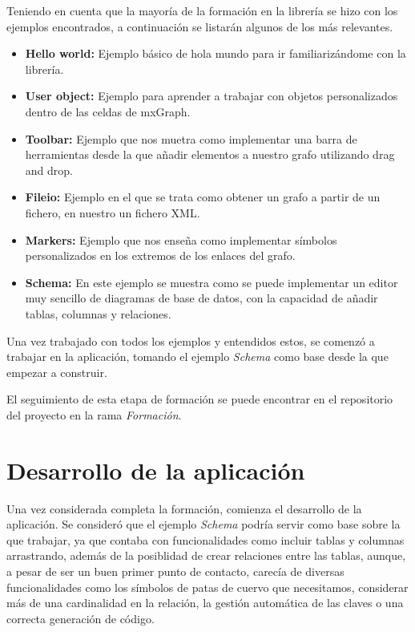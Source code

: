 Teniendo en cuenta que la mayoría de la formación en la librería se hizo con los ejemplos encontrados, a continuación se listarán algunos de los más relevantes.
\begin{itemize}
    \item \textbf{Hello world: }Ejemplo básico de hola mundo para ir familiarizándome con la librería.
    \item \textbf{User object: }Ejemplo para aprender a trabajar con objetos personalizados dentro de las celdas de mxGraph.
    \item \textbf{Toolbar: }Ejemplo que nos muetra como implementar una barra de herramientas desde la que añadir elementos a nuestro grafo utilizando drag and drop.
    \item \textbf{Fileio: }Ejemplo en el que se trata como obtener un grafo a partir de un fichero, en nuestro un fichero XML.
    \item \textbf{Markers: }Ejemplo que nos enseña como implementar símbolos personalizados en los extremos de los enlaces del grafo.
    \item \textbf{Schema: }En este ejemplo se muestra como se puede implementar un editor muy sencillo de diagramas de base de datos, con la capacidad de añadir tablas, columnas y relaciones.
\end{itemize}

Una vez trabajado con todos los ejemplos y entendidos estos, se comenzó a trabajar en la aplicación, tomando el ejemplo \emph{Schema} como base desde la que empezar a construir.

El seguimiento de esta etapa de formación se puede encontrar en el repositorio del proyecto en la rama \emph{Formación}.

\section{Desarrollo de la aplicación}

Una vez considerada completa la formación, comienza el desarrollo de la aplicación. Se consideró que el ejemplo \emph{Schema} podría servir como base sobre la que trabajar, ya que contaba con funcionalidades como incluir tablas y columnas arrastrando, además de la posiblidad de crear relaciones entre las tablas, aunque, a pesar de ser un buen primer punto de contacto, carecía de diversas funcionalidades como los símbolos de patas de cuervo que necesitamos, considerar más de una cardinalidad en la relación, la gestión automática de las claves o una correcta generación de código.

